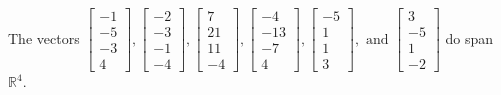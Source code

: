 \begin{exercise}
\begin{exerciseStatement}
  \end{exerciseStatement}
  \begin{exerciseAnswer}
   The vectors \(\left[\begin{array}{r}
-1 \\
-5 \\
-3 \\
4
\end{array}\right] , \left[\begin{array}{r}
-2 \\
-3 \\
-1 \\
-4
\end{array}\right] , \left[\begin{array}{r}
7 \\
21 \\
11 \\
-4
\end{array}\right] , \left[\begin{array}{r}
-4 \\
-13 \\
-7 \\
4
\end{array}\right] , \left[\begin{array}{r}
-5 \\
1 \\
1 \\
3
\end{array}\right] , \text{ and } \left[\begin{array}{r}
3 \\
-5 \\
1 \\
-2
\end{array}\right]\) 
  	 do  
	span \(\mathbb{R}^4\).
  


  \end{exerciseAnswer}
\end{exercise}